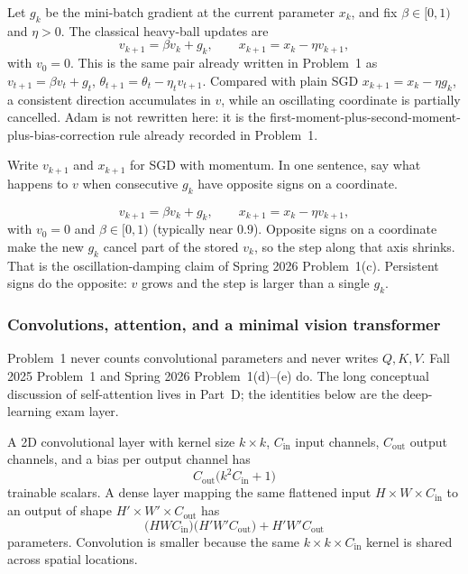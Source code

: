 \begin{proposition}
\label{prop:dlu-mom}
Let \(g_k\) be the mini-batch gradient at the current parameter \(x_k\), and fix \(\beta\in[0,1)\) and \(\eta>0\). The classical heavy-ball updates are
\[
v_{k+1}
=
\beta v_k+g_k,
\qquad
x_{k+1}
=
x_k-\eta v_{k+1},
\]
with \(v_0=0\). This is the same pair already written in Problem~1 as \(v_{t+1}=\beta v_t+g_t\), \(\theta_{t+1}=\theta_t-\eta_t v_{t+1}\). Compared with plain SGD \(x_{k+1}=x_k-\eta g_k\), a consistent direction accumulates in \(v\), while an oscillating coordinate is partially cancelled. Adam is not rewritten here: it is the first-moment-plus-second-moment-plus-bias-correction rule already recorded in Problem~1.
\end{proposition}

\begin{exercise}
\label{ex:dlu-mom}
Write \(v_{k+1}\) and \(x_{k+1}\) for SGD with momentum. In one sentence, say what happens to \(v\) when consecutive \(g_k\) have opposite signs on a coordinate.
\end{exercise}

\begin{solution}
\[
v_{k+1}=\beta v_k+g_k,
\qquad
x_{k+1}=x_k-\eta v_{k+1},
\]
with \(v_0=0\) and \(\beta\in[0,1)\) (typically near \(0.9\)). Opposite signs on a coordinate make the new \(g_k\) cancel part of the stored \(v_k\), so the step along that axis shrinks. That is the oscillation-damping claim of Spring 2026 Problem~1(c). Persistent signs do the opposite: \(v\) grows and the step is larger than a single \(g_k\).
\end{solution}


\subsubsection{Convolutions, attention, and a minimal vision transformer}
\label{subsubsec:dlu-cnn-attn}

Problem~1 never counts convolutional parameters and never writes \(Q,K,V\). Fall 2025 Problem~1 and Spring 2026 Problem~1(d)--(e) do. The long conceptual discussion of self-attention lives in Part~D; the identities below are the deep-learning exam layer.

\begin{proposition}
\label{prop:dlu-cnn-params}
A 2D convolutional layer with kernel size \(k\times k\), \(C_{\mathrm{in}}\) input channels, \(C_{\mathrm{out}}\) output channels, and a bias per output channel has
\[
C_{\mathrm{out}}\bigl(k^{2}C_{\mathrm{in}}+1\bigr)
\]
trainable scalars. A dense layer mapping the same flattened input \(H\times W\times C_{\mathrm{in}}\) to an output of shape \(H'\times W'\times C_{\mathrm{out}}\) has
\[
\bigl(HWC_{\mathrm{in}}\bigr)\bigl(H'W'C_{\mathrm{out}}\bigr)+H'W'C_{\mathrm{out}}
\]
parameters. Convolution is smaller because the same \(k\times k\times C_{\mathrm{in}}\) kernel is shared across spatial locations.
\end{proposition}

